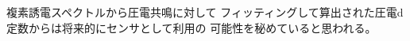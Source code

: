 \documentclass[dvipdfmx,12pt,a4paper]{jreport}
\begin{document}
	複素誘電スペクトルから圧電共鳴に対して
	フィッティングして算出された圧電d定数からは将来的にセンサとして利用の
	可能性を秘めていると思われる。

\end{document}
